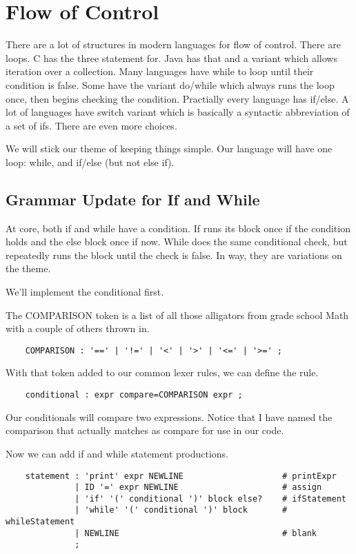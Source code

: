 \chapter{Flow of Control}

There are a lot of structures in modern languages for flow of control.
There are loops. C has the three statement for. Java has that and a
variant which allows iteration over a collection. Many languages
have while to loop until their condition is false. Some have the
variant do/while which always runs the loop once, then begins
checking the condition. Practially every language has if/else.
A lot of languages have switch variant which is basically a syntactic
abbreviation of a set of ifs. There are even more choices.

We will stick our theme of keeping things simple. Our language will
have one loop: while, and if/else (but not else if).

\section{Grammar Update for If and While}

At core, both if and while have a condition. If runs its block once
if the condition holds and the else block once if now. While does
the same conditional check, but repeatedly runs the block until the
check is false. In way, they are variations on the theme.

We'll implement the conditional first.

The COMPARISON token is a list of all those alligators from grade school Math
with a couple of others thrown in.

{\footnotesize
\begin{verbatim}
    COMPARISON : '==' | '!=' | '<' | '>' | '<=' | '>=' ;
\end{verbatim}
}

With that token added to our common lexer rules, we can define the rule.

{\footnotesize
\begin{verbatim}
    conditional : expr compare=COMPARISON expr ;
\end{verbatim}
}

Our conditionals will compare two expressions. Notice that I have named
the comparison that actually matches as compare for use in our code.

Now we can add if and while statement productions.

{\footnotesize
\begin{verbatim}
    statement : 'print' expr NEWLINE                    # printExpr
              | ID '=' expr NEWLINE                     # assign
              | 'if' '(' conditional ')' block else?    # ifStatement
              | 'while' '(' conditional ')' block       # whileStatement
              | NEWLINE                                 # blank
              ;
\end{verbatim}
}

